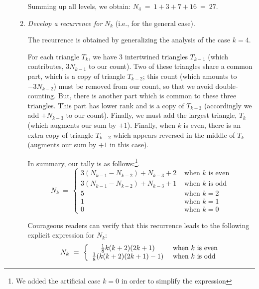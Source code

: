 \begin{itemize}
\begin{enumerate}
\smallskip

Summing up all levels, we obtain:  $N_4 \ = \ 1 + 3 + 7 + 16 \ = \ 27$.

\medskip\item
{\em Develop a recurrence for} $N_k$ (i.e., for the general case).

\smallskip

The recurrence is obtained by generalizing the analysis of the case $k=4$.

\smallskip

For each triangle $T_k$, we have $3$ intertwined triangles $T_{k-1}$ (which contributes, $3 N_{k-1}$ to our count).  Two of these triangles share a common part, which is a copy of triangle $T_{k-2}$; this count (which amounts to $ -3 N_{k-2}$) must be removed from our count, so that we avoid double-counting.  But, there is another part which is common to these three triangles. This part has lower rank and is a copy of $T_{k-3}$ (accordingly we add $+ N_{k-3}$ to our count).  Finally, we must add the largest triangle, $T_{k}$ (which augments our sum by $+1$).  Finally, when $k$ is even,  there is an extra copy of triangle $T_{k-2}$ which appears reversed in the middle of $T_k$ (augments our sum by $+1$ in this case).

\smallskip

In summary, our tally is as follows:\footnote{We added the artificial case $k=0$ in order to simplify the expression}.
\[ N_k \ = \ \left\{
\begin{array}{cl}
3 (N_{k-1} - N_{k-2}) + N_{k-3} + 2 & \mbox{ when $k$ is even} \\
3 (N_{k-1} - N_{k-2}) + N_{k-3} + 1 & \mbox{ when $k$ is odd} \\
5 & \mbox{ when $k=2$} \\
1 & \mbox{ when $k=1$} \\
0 & \mbox{ when $k=0$}
\end{array}
\right. \] 


\medskip

Courageous readers can verify that this recurrence leads to the following explicit expression for $N_k$:
\[ N_k \ = \ \left\{
\begin{array}{cl}
{1 \over 8} k(k+2)(2k+1) & \mbox{ when $k$ is even} \\ 
{1 \over 8} (k(k+2)(2k+1)-1)  & \mbox{ when $k$ is odd}
\end{array}
\right. \]
\end{enumerate}


\end{itemize}
